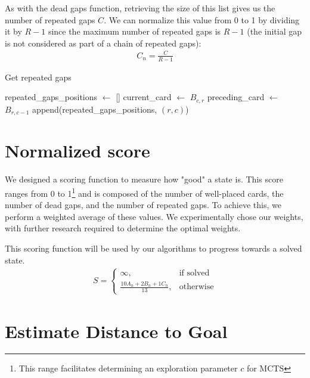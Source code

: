 As with the dead gaps function, retrieving the size of this list gives us the number of repeated gaps $C$. We can normalize this value from 0 to 1 by dividing it by $R-1$ since the maximum number of repeated gaps is $R-1$ (the initial gap is not considered as part of a chain of repeated gaps):
\begin{align}
    C_n = \frac{C}{R-1}
\end{align}

\begin{algorithm}[H]
    \caption{Get repeated gaps}
    \begin{algorithmic}
        \State repeated\_gaps\_positions $\gets$ []
                \State current\_card $\gets$ $B_{c,r}$
                \State preceding\_card $\gets$ $B_{r,c-1}$
                    \State append(repeated\_gaps\_positions, $(r,c)$)
                \EndIf
            \EndFor
        \EndFor
    \end{algorithmic}
\end{algorithm}

\section{Normalized score}
We designed a scoring function to measure how "good" a state is. This score ranges from 0 to 1\footnote{This range facilitates determining an exploration parameter $c$ for MCTS} and is composed of the number of well-placed cards, the number of dead gaps, and the number of repeated gaps. To achieve this, we perform a weighted average of these values. We experimentally chose our weights, with further research required to determine the optimal weights.

This scoring function will be used by our algorithms to progress towards a solved state.
\begin{align}
    S = \begin{cases}
       \infty, & \text{if solved} \\
        \frac{10A_n + 2B_n + 1C_n}{13}, & \text{otherwise}
    \end{cases}
\end{align}

\section{Estimate Distance to Goal}

